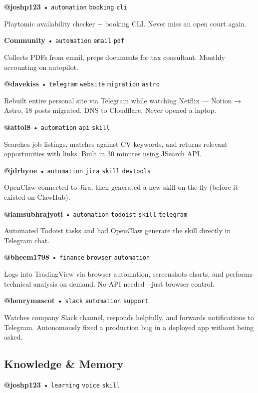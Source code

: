 \textbf{@joshp123} • \texttt{automation} \texttt{booking} \texttt{cli}

Playtomic availability checker + booking CLI. Never miss an open court again.


\textbf{Community} • \texttt{automation} \texttt{email} \texttt{pdf}

Collects PDFs from email, preps documents for tax consultant. Monthly accounting on autopilot.

\textbf{@davekiss} • \texttt{telegram} \texttt{website} \texttt{migration} \texttt{astro}

Rebuilt entire personal site via Telegram while watching Netflix — Notion → Astro, 18 posts migrated, DNS to Cloudflare. Never opened a laptop.

\textbf{@attol8} • \texttt{automation} \texttt{api} \texttt{skill}

Searches job listings, matches against CV keywords, and returns relevant opportunities with links. Built in 30 minutes using JSearch API.

\textbf{@jdrhyne} • \texttt{automation} \texttt{jira} \texttt{skill} \texttt{devtools}

OpenClaw connected to Jira, then generated a new skill on the fly (before it existed on ClawHub).

\textbf{@iamsubhrajyoti} • \texttt{automation} \texttt{todoist} \texttt{skill} \texttt{telegram}

Automated Todoist tasks and had OpenClaw generate the skill directly in Telegram chat.

\textbf{@bheem1798} • \texttt{finance} \texttt{browser} \texttt{automation}

Logs into TradingView via browser automation, screenshots charts, and performs technical analysis on demand. No API needed—just browser control.

\textbf{@henrymascot} • \texttt{slack} \texttt{automation} \texttt{support}

Watches company Slack channel, responds helpfully, and forwards notifications to Telegram. Autonomously fixed a production bug in a deployed app without being asked.


\subsection{Knowledge \& Memory}



\textbf{@joshp123} • \texttt{learning} \texttt{voice} \texttt{skill}

